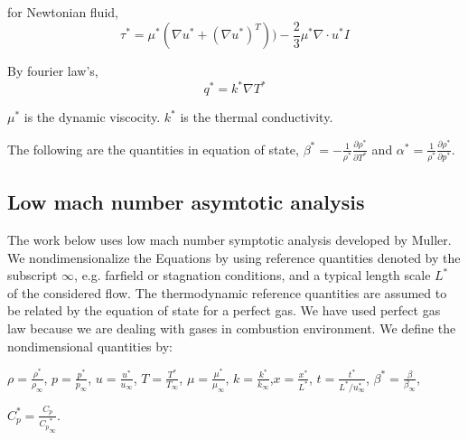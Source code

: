 \bigskip

for Newtonian fluid, $$\tau^* = \mu^*(\nabla u^* +(\nabla u^*)^T)) - \frac{2}{3}\mu^*\nabla \cdot u^*I$$

By fourier law's, 
$$q^* =  k^* \nabla T^*$$

\bigskip

$\mu^*$ is the dynamic viscocity. $k^*$ is the thermal conductivity.

\bigskip

\noindent The following are the quantities in equation of state, $\beta^* = -\frac{1}{\rho^*}\frac{\partial \rho^*}{\partial T^*}$ and $\alpha^* = \frac{1}{\rho^*}\frac{\partial \rho^*}{\partial p^*}$.

\subsection{Low mach number asymtotic analysis}

The work below uses low mach number symptotic analysis developed by Muller\cite{Muller}. We nondimensionalize the Equations by using reference quantities denoted by the subscript $\infty$,
e.g. farfield or stagnation conditions, and a typical length scale $L^*$ of the considered
flow. The thermodynamic reference quantities are assumed to be related by the equation of
state for a perfect gas. We have used perfect gas law because we are dealing with gases in combustion environment. We define the nondimensional quantities by:\\

\bigskip

$\rho = \frac{\rho^*}{\rho_\infty} $, $p = \frac{p^*}{p_\infty} $, $u = \frac{u^*}{u_\infty} $, $T = \frac{T^*}{T_\infty} $, $\mu = \frac{\mu^*}{\mu_\infty} $, $k = \frac{k^*}{k_\infty} $,$x = \frac{x^*}{L^*} $, $t = \frac{t^*}{L^*/u^*_{\infty}} $, $\beta^* = \frac{\beta}{\beta_{\infty}} $, 
\bigskip

$C_p^* = \frac{C_p}{{C_p}^*_{\infty}}$.


